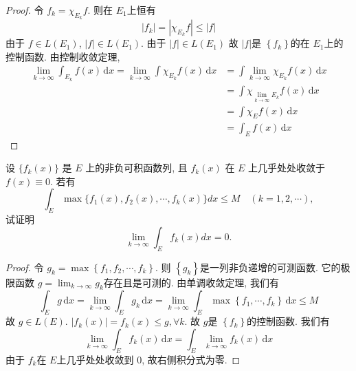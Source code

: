\documentclass[../main.tex]{subfiles}
\begin{document}
\begin{proof}
    令 \(  f_{k}= \chi _{E_{k}}f  \). 则在 \(  E_1  \)上恒有  \[
    \left| f_{k} \right|= \left| \chi _{E_{k}}f \right|\le \left| f \right|   
    \]由于 \(  f\in L\left( E_{1} \right)   \), \(  \left| f \right|\in L\left( E_{1} \right)    \). 由于 \(  \left| f \right|\in L\left( E_1 \right)    \) 故 \(  \left| f \right|   \)是 \(  \left\{ f_{k} \right\}  \)的在 \(  E_1  \)上的 控制函数. 由控制收敛定理, \[
   \begin{aligned}
    \lim_{k\to \infty}\int_{E_{k}}f\left( x \right)\,\mathrm{d} x=  \lim_{k\to \infty}\int \chi _{E_{k}}f\left( x \right)\,\mathrm{d} x&= \int \lim_{k\to \infty}\chi _{E_{k}}f\left( x \right)\,\mathrm{d} x \\ 
     &= \int \chi _{\lim_{k\to \infty}E_{k}}f\left( x \right)\,\mathrm{d} x\\ 
      &= \int \chi _{E}f\left( x \right)\,\mathrm{d} x\\ 
       &= \int_{E}f\left( x \right)\,\mathrm{d} x   
   \end{aligned}   
    \]     
\end{proof}
\begin{exercise}{}{}
    设 $\{f_k(x)\}$ 是 $E$ 上的非负可积函数列, 且 $f_k(x)$ 在 $E$ 上几乎处处收敛于 $f(x) \equiv 0$. 若有
\[
\int_E \max\{f_1(x), f_2(x), \cdots, f_k(x)\} dx \le M \quad (k=1,2,\cdots),
\]
试证明
\[
\lim_{k \to \infty} \int_E f_k(x) dx = 0.
\]
\end{exercise}
\begin{proof}
    令 \(  g_{k}= \max \left\{ f_1,f_2,\cdots ,f_{k} \right\}  \). 则 \(  \left\{ g_{k} \right\}  \)是一列非负递增的可测函数. 它的极限函数 \(  g = \lim_{k\to \infty}g_{k}  \)存在且是可测的. 由单调收敛定理, 我们有 \[
    \int_{E}g\,\mathrm{d} x= \lim_{k\to \infty}\int_{E}g_{k}\,\mathrm{d} x= \lim_{k\to \infty} \int_{E}\max \left\{ f_1,\cdots ,f_{k} \right\}\,\mathrm{d} x\le M
    \] 故 \(  g\in L\left( E \right)   \). \(  \left| f_{k}\left( x \right)  \right|= f_{k}\left( x \right)\le  g    ,\forall k\). 故 \(  g  \)是 \(  \left\{ f_{k} \right\}  \)的控制函数. 我们有 \[
    \lim_{k\to \infty}\int_{E}f_{k}\left( x \right)\,\mathrm{d} x=  \int_{E}\lim_{k\to \infty}f_{k}\left( x \right) \,\mathrm{d} x
    \]  由于 \(  f_{k}  \)在 \(  E  \)上几乎处处收敛到 \(  0  \), 故右侧积分式为零.   
\end{proof}
\end{document}
